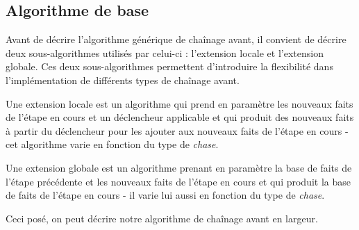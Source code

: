

\subsection{Algorithme de base}\label{subsec:algo_base_ch_avant}


Avant de décrire l'algorithme générique de chaînage avant, il convient de décrire deux sous-algorithmes utilisés par celui-ci : l'extension locale et l'extension globale. Ces deux sous-algorithmes permettent d'introduire la flexibilité dans l'implémentation de différents types de chaînage avant.

\par Une extension locale est un algorithme qui prend en paramètre les nouveaux faits de l'étape en cours et un déclencheur applicable et qui produit des nouveaux faits à partir du déclencheur pour les ajouter aux nouveaux faits de l'étape en cours - cet algorithme varie en fonction du type de \textit{chase}.
\par Une extension globale est un algorithme prenant en paramètre la base de faits de l'étape précédente et les nouveaux faits de l'étape en cours et qui produit la base de faits de l'étape en cours - il varie lui aussi en fonction du type de \textit{chase}.
\par Ceci posé, on peut décrire notre algorithme de chaînage avant en largeur.

